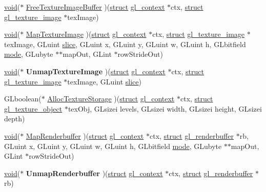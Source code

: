 \begin{Indent}
\begin{DoxyCompactItemize}
\item 
\hyperlink{interfacevoid}{void}($\ast$ \hyperlink{structdd__function__table_af2144a2c96c3385cb1b48d73c0e4cb02}{Free\+Texture\+Image\+Buffer} )(\hyperlink{interfacestruct}{struct} \hyperlink{structgl__context}{gl\+\_\+context} $\ast$ctx, \hyperlink{interfacestruct}{struct} \hyperlink{structgl__texture__image}{gl\+\_\+texture\+\_\+image} $\ast$tex\+Image)
\item 
\hyperlink{interfacevoid}{void}($\ast$ \hyperlink{structdd__function__table_a7d502b09d3cf21951c5a85b5ec83085d}{Map\+Texture\+Image} )(\hyperlink{interfacestruct}{struct} \hyperlink{structgl__context}{gl\+\_\+context} $\ast$ctx, \hyperlink{interfacestruct}{struct} \hyperlink{structgl__texture__image}{gl\+\_\+texture\+\_\+image} $\ast$tex\+Image, G\+Luint \hyperlink{classslice}{slice}, G\+Luint x, G\+Luint y, G\+Luint w, G\+Luint h, G\+Lbitfield \hyperlink{interfacevoid}{mode}, G\+Lubyte $\ast$$\ast$map\+Out, G\+Lint $\ast$row\+Stride\+Out)
\item 
\mbox{\label{structdd__function__table_ae334361d1ef191ad0463a11b4a365f77}} 
\hyperlink{interfacevoid}{void}($\ast$ {\bfseries Unmap\+Texture\+Image} )(\hyperlink{interfacestruct}{struct} \hyperlink{structgl__context}{gl\+\_\+context} $\ast$ctx, \hyperlink{interfacestruct}{struct} \hyperlink{structgl__texture__image}{gl\+\_\+texture\+\_\+image} $\ast$tex\+Image, G\+Luint \hyperlink{classslice}{slice})
\item 
G\+Lboolean($\ast$ \hyperlink{structdd__function__table_a566b2982fc336288f889493284132c8f}{Alloc\+Texture\+Storage} )(\hyperlink{interfacestruct}{struct} \hyperlink{structgl__context}{gl\+\_\+context} $\ast$ctx, \hyperlink{interfacestruct}{struct} \hyperlink{structgl__texture__object}{gl\+\_\+texture\+\_\+object} $\ast$tex\+Obj, G\+Lsizei levels, G\+Lsizei width, G\+Lsizei height, G\+Lsizei depth)
\item 
\hyperlink{interfacevoid}{void}($\ast$ \hyperlink{structdd__function__table_af1eb4b8689ff956a3ee1ebbd5c23aa2e}{Map\+Renderbuffer} )(\hyperlink{interfacestruct}{struct} \hyperlink{structgl__context}{gl\+\_\+context} $\ast$ctx, \hyperlink{interfacestruct}{struct} \hyperlink{structgl__renderbuffer}{gl\+\_\+renderbuffer} $\ast$rb, G\+Luint x, G\+Luint y, G\+Luint w, G\+Luint h, G\+Lbitfield \hyperlink{interfacevoid}{mode}, G\+Lubyte $\ast$$\ast$map\+Out, G\+Lint $\ast$row\+Stride\+Out)
\item 
\mbox{\label{structdd__function__table_a547fdd189c51be227257a6ed23532789}} 
\hyperlink{interfacevoid}{void}($\ast$ {\bfseries Unmap\+Renderbuffer} )(\hyperlink{interfacestruct}{struct} \hyperlink{structgl__context}{gl\+\_\+context} $\ast$ctx, \hyperlink{interfacestruct}{struct} \hyperlink{structgl__renderbuffer}{gl\+\_\+renderbuffer} $\ast$rb)
\end{DoxyCompactItemize}
\end{Indent}
